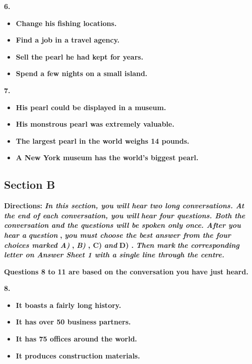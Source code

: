 \documentclass[UTF8,11pt]{ctexart}
\begin{document}
\textbf{6.}


\begin{itemize}[leftmargin=2em,itemsep=.2em,topsep=.4em]\item[A.] \textbf{Change his fishing locations.}
\item[B.] \textbf{Find a job in a travel agency.}
\item[C.] \textbf{Sell the pearl he had kept for years.}
\item[D.] \textbf{Spend a few nights on a small island.}
\end{itemize}

\textbf{7.}


\begin{itemize}[leftmargin=2em,itemsep=.2em,topsep=.4em]\item[A.] \textbf{His pearl could be displayed in a museum.}
\item[B.] \textbf{His monstrous pearl was extremely valuable.}
\item[C.] \textbf{The largest pearl in the world weighs 14 pounds.}
\item[D.] \textbf{A New York museum has the world's biggest pearl.}
\end{itemize}

\subsection*{\textbf{Section B}}


\textbf{Directions: }\textbf{\textit{In this section, you will hear two long conversations. At the end of each conversation, you will}} \textbf{\textit{hear four questions. Both the conversation and the questions will be spoken only once. After you hear a}} \textbf{\textit{question }}\textbf{, }\textbf{\textit{you must choose the best answer from the four choices marked A) }}\textbf{, }\textbf{\textit{B) }}\textbf{, C) }\textbf{\textit{and }}\textbf{D) . }\textbf{\textit{Then mark}} \textbf{\textit{the corresponding letter on Answer Sheet 1 with a single line through the centre.}}


\textbf{Questions 8 to 11 are based on the conversation you have just heard.}


\textbf{8.}


\begin{itemize}[leftmargin=2em,itemsep=.2em,topsep=.4em]\item[A.] \textbf{It boasts a fairly long history.}
\item[B.] \textbf{It has over 50 business partners.}
\item[C.] \textbf{It has 75 offices around the world.}
\item[D.] \textbf{It produces construction materials.}
\end{itemize}
\end{document}
